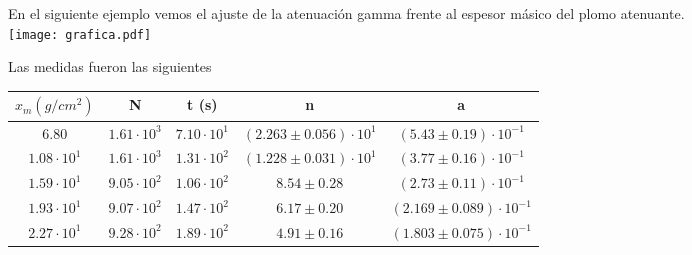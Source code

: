 \documentclass[10pt]{article}
\begin{document}
En el siguiente ejemplo vemos el ajuste de la atenuaci\'on gamma frente al espesor m\'asico del plomo atenuante. \\
\texttt{[image: grafica.pdf]}

Las medidas fueron las siguientes \\
\begin{centering}
\begin{tabular}{|c|c|c|c|c|}
\hline
$x_{m} (g/cm^2)$ & N & t (s) & n & a \\ \hline $6.80$ & $1.61\cdot 10^{3}$ & $7.10\cdot 10^{1}$ & $\left(2.263\pm0.056\right)\cdot 10^{1}$ & $\left(5.43\pm0.19\right)\cdot 10^{-1}$\\\hline $1.08\cdot 10^{1}$ & $1.61\cdot 10^{3}$ & $1.31\cdot 10^{2}$ & $\left(1.228\pm0.031\right)\cdot 10^{1}$ & $\left(3.77\pm0.16\right)\cdot 10^{-1}$\\\hline $1.59\cdot 10^{1}$ & $9.05\cdot 10^{2}$ & $1.06\cdot 10^{2}$ & $8.54\pm0.28$ & $\left(2.73\pm0.11\right)\cdot 10^{-1}$\\\hline $1.93\cdot 10^{1}$ & $9.07\cdot 10^{2}$ & $1.47\cdot 10^{2}$ & $6.17\pm0.20$ & $\left(2.169\pm0.089\right)\cdot 10^{-1}$\\\hline $2.27\cdot 10^{1}$ & $9.28\cdot 10^{2}$ & $1.89\cdot 10^{2}$ & $4.91\pm0.16$ & $\left(1.803\pm0.075\right)\cdot 10^{-1}$\\
\hline
\end{tabular}
\end{centering}
\end{document}

